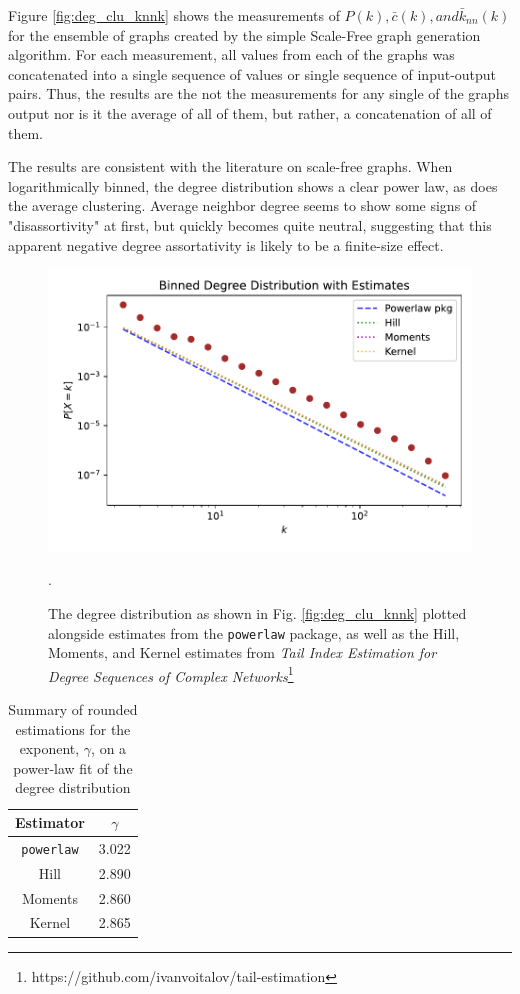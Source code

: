 \documentclass{neu-assignment}
\begin{document}
Figure \ref{fig:deg_clu_knnk} shows the measurements of $P(k), \bar{c}(k), and \bar{k}_{nn}(k)$ for the ensemble of graphs created by the simple Scale-Free graph generation algorithm. For each measurement, all values from each of the graphs was concatenated into a single sequence of values or single sequence of input-output pairs. Thus, the results are the not the measurements for any single of the graphs output nor is it the average of all of them, but rather, a concatenation of all of them. 

The results are consistent with the literature on scale-free graphs. When logarithmically binned, the degree distribution shows a clear power law, as does the average clustering. Average neighbor degree seems to show some signs of "disassortivity" at first, but quickly becomes quite neutral, suggesting that this apparent negative degree assortativity is likely to be a finite-size effect. 

\begin{figure}[h!]
    \centering
    \includegraphics[scale=0.7]{figures/HW1_fig2_degree_dist_estimates.pdf}
    \caption{The degree distribution as shown in Fig. \ref{fig:deg_clu_knnk} plotted alongside estimates from the \texttt{powerlaw} package, as well as the Hill, Moments, and Kernel estimates from \textit{Tail Index Estimation for Degree Sequences of Complex Networks}\footnote{https://github.com/ivanvoitalov/tail-estimation}}.
    \label{fig:etimation}
\end{figure}

\begin{table}[h!]
    \centering
    \begin{tabular}{c c}
        Estimator  &  $\gamma$ \\
        \hline
        \texttt{powerlaw} & 3.022 \\
        Hill & 2.890 \\
        Moments & 2.860 \\
        Kernel & 2.865
    \end{tabular}
    \caption{Summary of rounded estimations for the exponent, $\gamma$, on a power-law fit of the degree distribution}
    \label{tab:estimates_table}
\end{table}
\end{document}
